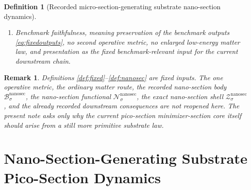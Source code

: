 \documentclass[11pt]{article}
\newcommand{\MicroSectionShell}[1]{\mathcal Z_{#1}^{\mathrm{microsec}}}
\newcommand{\NanoSectionBody}[1]{\mathcal B_{#1}^{\mathrm{nanosec}}}
\newcommand{\NanoSectionProj}[1]{\Pi_{#1}^{\mathrm{nanosec}}}
\newcommand{\NanoSectionFiber}[2]{\mathcal F_{#1}^{\mathrm{nanosec}}(#2)}
\newcommand{\NanoSectionFunctional}[1]{\mathscr N_{#1}^{\mathrm{nanosec}}}
\newcommand{\NanoSectionShell}[1]{\mathcal Z_{#1}^{\mathrm{nanosec}}}
\newtheorem{definition}{Definition}
\newtheorem{remark}{Remark}
\begin{document}
\begin{definition}[Recorded micro-section-generating substrate nano-section dynamics]
\begin{enumerate}
\[\begin{array}{l}
    \NanoSectionFunctional{\sigma}(p)
    =
    \displaystyle\min_{q\in\NanoSectionFiber{\sigma}{\NanoSectionProj{\sigma}(p)}}
    \NanoSectionFunctional{\sigma}(q)
    \end{array}
    \right\},
    \]
    and
    \[
    \NanoSectionProj{\sigma}\big|_{\NanoSectionShell{\sigma}}
    :
    \NanoSectionShell{\sigma}
    \xrightarrow{\cong}
    \MicroSectionShell{\sigma}
    \]
    is a diffeomorphism.
    \item Benchmark faithfulness, meaning preservation of the benchmark outputs \eqref{eq:fixedoutputs}, no second operative metric, no enlarged low-energy matter law, and presentation as the fixed benchmark-relevant input for the current downstream chain.
\end{enumerate}
\end{definition}

\begin{remark}
Definitions \ref{def:fixed}--\ref{def:nanosec} are fixed inputs. The one operative metric, the ordinary matter route, the recorded nano-section body \(\NanoSectionBody{\sigma}\), the nano-section functional \(\NanoSectionFunctional{\sigma}\), the exact nano-section shell \(\NanoSectionShell{\sigma}\), and the already recorded downstream consequences are not reopened here. The present note asks only why the current pico-section minimizer-section core itself should arise from a still more primitive substrate law.
\end{remark}

\section{Nano-Section-Generating Substrate Pico-Section Dynamics}
\end{document}
